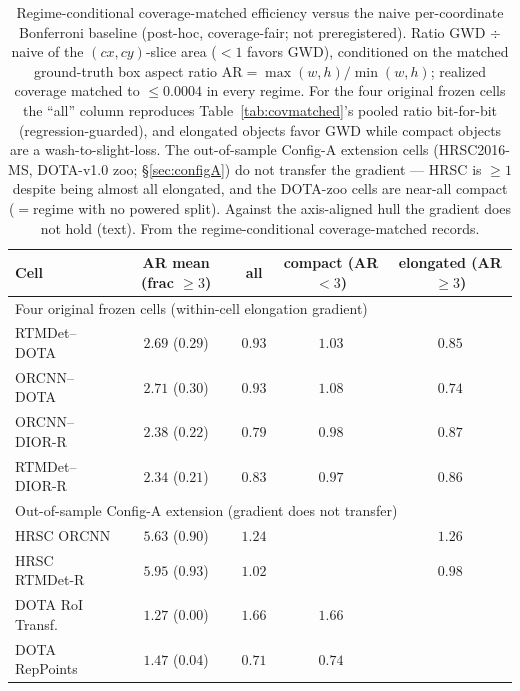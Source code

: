 \documentclass[journal]{IEEEtran}
\begin{document}
\begin{table}[!t]\centering\small
\caption{Regime-conditional coverage-matched efficiency versus the naive per-coordinate
Bonferroni baseline (post-hoc, coverage-fair; not preregistered). Ratio GWD $\div$ naive of the
$(cx,cy)$-slice area (${<}1$ favors GWD), conditioned on the matched ground-truth box aspect ratio
$\mathrm{AR}=\max(w,h)/\min(w,h)$; realized coverage matched to $\le 0.0004$ in every regime.
For the four original frozen cells the ``all'' column reproduces Table~\ref{tab:covmatched}'s pooled
ratio bit-for-bit (regression-guarded), and elongated objects favor GWD while compact objects are a
wash-to-slight-loss. The out-of-sample Config-A extension cells (HRSC2016-MS, DOTA-v1.0 zoo;
\S\ref{sec:configA}) do not transfer the gradient --- HRSC is $\ge1$ despite being almost all elongated,
and the DOTA-zoo cells are near-all compact (\textemdash{}$=$regime with no powered split). Against the
axis-aligned hull the gradient does not hold (text). From the regime-conditional coverage-matched
records.}\label{tab:regime}
\begin{tabular}{lcccc}
\toprule
Cell & AR mean (frac ${\ge}3$) & all & compact (AR${<}3$) & elongated (AR${\ge}3$) \\
\midrule
\multicolumn{5}{l}{Four original frozen cells (within-cell elongation gradient)} \\
RTMDet--DOTA   & $2.69$ ($0.29$) & $0.93$ & $1.03$ & $0.85$ \\
ORCNN--DOTA    & $2.71$ ($0.30$) & $0.93$ & $1.08$ & $0.74$ \\
ORCNN--DIOR-R  & $2.38$ ($0.22$) & $0.79$ & $0.98$ & $0.87$ \\
RTMDet--DIOR-R & $2.34$ ($0.21$) & $0.83$ & $0.97$ & $0.86$ \\
\midrule
\multicolumn{5}{l}{Out-of-sample Config-A extension (gradient does not transfer)} \\
HRSC ORCNN         & $5.63$ ($0.90$) & $1.24$ & \textemdash{} & $1.26$ \\
HRSC RTMDet-R      & $5.95$ ($0.93$) & $1.02$ & \textemdash{} & $0.98$ \\
DOTA RoI Transf.   & $1.27$ ($0.00$) & $1.66$ & $1.66$ & \textemdash{} \\
DOTA RepPoints     & $1.47$ ($0.04$) & $0.71$ & $0.74$ & \textemdash{} \\
\bottomrule
\end{tabular}
\end{table}
\end{document}
